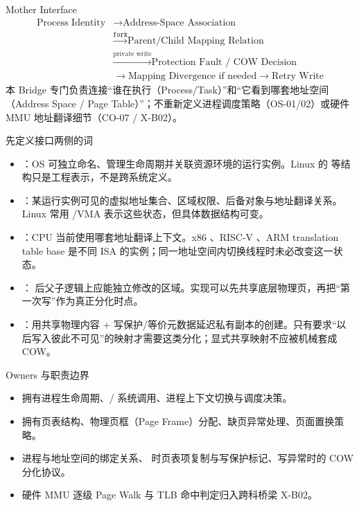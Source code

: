 \documentclass[UTF8,fontset=none,11pt,a4paper]{ctexart}
\begin{document}

\begin{corebox}{Mother Interface}
\[
\boxed{
\begin{aligned}
\text{Process Identity} &\to \text{Address-Space Association} \\
&\xrightarrow{\texttt{fork}} \text{Parent/Child Mapping Relation} \\
&\xrightarrow{\text{private write}} \text{Protection Fault / COW Decision} \\
&\to \text{Mapping Divergence if needed} \to \text{Retry Write}
\end{aligned}
}
\]
本 Bridge 专门负责连接“谁在执行（Process/Task）”和“它看到哪套地址空间（Address Space / Page Table）”；不重新定义进程调度策略（OS-01/02）或硬件 MMU 地址翻译细节（CO-07 / X-B02）。
\end{corebox}

\begin{methodbox}{先定义接口两侧的词}
\begin{itemize}
  \item {}：OS 可独立命名、管理生命周期并关联资源环境的运行实例。Linux 的  等结构只是工程表示，不是跨系统定义。
  \item {}：某运行实例可见的虚拟地址集合、区域权限、后备对象与地址翻译关系。Linux 常用 /VMA 表示这些状态，但具体数据结构可变。
  \item {}：CPU 当前使用哪套地址翻译上下文。x86 、RISC-V 、ARM translation table base 是不同 ISA 的实例；同一地址空间内切换线程时未必改变这一状态。
  \item {}： 后父子逻辑上应能独立修改的区域。实现可以先共享底层物理页，再把“第一次写”作为真正分化时点。
  \item {}：用共享物理内容 + 写保护/等价元数据延迟私有副本的创建。只有要求“以后写入彼此不可见”的映射才需要这类分化；显式共享映射不应被机械套成 COW。
\end{itemize}
\end{methodbox}

\begin{methodbox}{Owners 与职责边界}
\begin{itemize}
  \item {}拥有进程生命周期、/ 系统调用、进程上下文切换与调度决策。
  \item {}拥有页表结构、物理页框（Page Frame）分配、缺页异常处理、页面置换策略。
  \item {}进程与地址空间的绑定关系、 时页表项复制与写保护标记、写异常时的 COW 分化协议。
  \item {}硬件 MMU 逐级 Page Walk 与 TLB 命中判定归入跨科桥梁 X-B02。
\end{itemize}
\end{methodbox}
\end{document}
